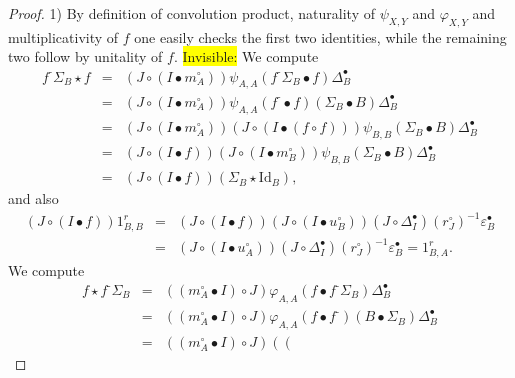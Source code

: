 \documentclass[nosumlimits,twoside]{amsart}
\theoremstyle{definition}
\theoremstyle{remark}
\def\revsn{\text{-}}
\newenvironment{invisible}{{\noindent\sc \colorbox{yellow}{Invisible:}\;}\color{gray}}{\medskip}
\begin{document}
\begin{proof}
1) By definition of convolution product, naturality of $\psi_{X,Y}$ and $\varphi _{X,Y}$ and multiplicativity of $f$ one easily checks the first two identities, while the remaining two follow by unitality of $f$.
\begin{invisible}
 We compute%
\begin{eqnarray*}
f^{\revsn }\Sigma _{B}\star f &=&\left( J\circ \left( I\bullet m_{A}^{\circ
}\right) \right) \psi _{A,A}\left( f^{\revsn }\Sigma _{B}\bullet f\right)
\Delta _{B}^{\bullet } \\
&=&\left( J\circ \left( I\bullet m_{A}^{\circ }\right) \right) \psi
_{A,A}\left( f^{\revsn }\bullet f\right) \left( \Sigma _{B}\bullet B\right)
\Delta _{B}^{\bullet } \\
&=&\left( J\circ \left( I\bullet m_{A}^{\circ }\right) \right) \left( J\circ
\left( I\bullet \left( f\circ f\right) \right) \right) \psi _{B,B}\left(
\Sigma _{B}\bullet B\right) \Delta _{B}^{\bullet } \\
&=&\left( J\circ \left( I\bullet f\right) \right) \left( J\circ \left(
I\bullet m_{B}^{\circ }\right) \right) \psi _{B,B}\left( \Sigma _{B}\bullet
B\right) \Delta _{B}^{\bullet } \\
&=&\left( J\circ \left( I\bullet f\right) \right) \left( \Sigma _{B}\star
\mathrm{Id}_{B}\right) ,
\end{eqnarray*}  
and also 
\begin{eqnarray*}
\left( J\circ \left( I\bullet f\right) \right) 1_{B,B}^{r} &=&\left( J\circ
\left( I\bullet f\right) \right) \left( J\circ \left( I\bullet u_{B}^{\circ
}\right) \right) \left( J\circ \Delta _{I}^{\bullet }\right) \left(
r_{J}^{\circ }\right) ^{-1}\varepsilon _{B}^{\bullet } \\
&=&\left( J\circ \left( I\bullet u_{A}^{\circ }\right) \right) \left( J\circ
\Delta _{I}^{\bullet }\right) \left( r_{J}^{\circ }\right) ^{-1}\varepsilon
_{B}^{\bullet }=1_{B,A}^{r}.
\end{eqnarray*} 
We compute
 \begin{eqnarray*}
f\star f^{\revsn }\Sigma _{B} &=&\left( \left( m_{A}^{\circ }\bullet I\right)
\circ J\right) \varphi _{A,A}\left( f\bullet f^{\revsn }\Sigma _{B}\right)
\Delta _{B}^{\bullet } \\
&=&\left( \left( m_{A}^{\circ }\bullet I\right) \circ J\right) \varphi
_{A,A}\left( f\bullet f^{\revsn }\right) \left( B\bullet \Sigma _{B}\right)
\Delta _{B}^{\bullet } \\
&=&\left( \left( m_{A}^{\circ }\bullet I\right) \circ J\right) \left( \left(

\end{eqnarray*}
\end{invisible}
\end{proof}
\end{document}
